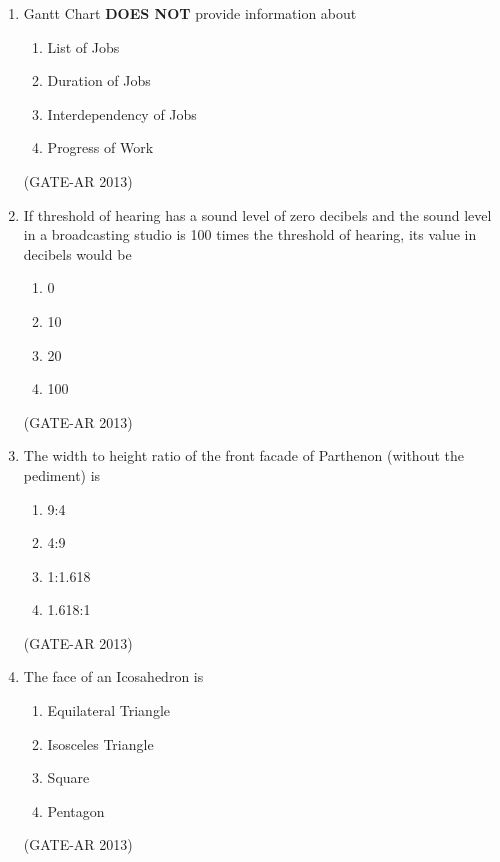 \documentclass[a4paper,10pt]{article}
\begin{document}
\begin{enumerate}
    \item Gantt Chart \textbf{DOES NOT} provide information about 
    \begin{multicols}{2}
	\begin{enumerate}
        \item List of Jobs
        \item Duration of Jobs
        \item Interdependency of Jobs
        \item Progress of Work
    \end{enumerate}
	\end{multicols}
    \hfill (GATE-AR 2013)

    \item If threshold of hearing has a sound level of zero decibels and the sound level in a broadcasting studio is 100 times the threshold of hearing, its value in decibels would be 
    \begin{multicols}{4}
	\begin{enumerate}
        \item 0
        \item 10
        \item 20
        \item 100
    \end{enumerate}
	\end{multicols}
    \hfill (GATE-AR 2013)

    \item The width to height ratio of the front facade of Parthenon (without the pediment) is 
    \begin{multicols}{2}
	\begin{enumerate}
        \item 9:4
        \item 4:9
        \item 1:1.618
        \item 1.618:1
    \end{enumerate}
	\end{multicols}
    \hfill (GATE-AR 2013)
    
    \item The face of an Icosahedron is 
    \begin{multicols}{2}
	\begin{enumerate}
        \item Equilateral Triangle
        \item Isosceles Triangle
        \item Square
        \item Pentagon
    \end{enumerate}
	\end{multicols}
    \hfill (GATE-AR 2013)


\end{enumerate}
\end{document}
